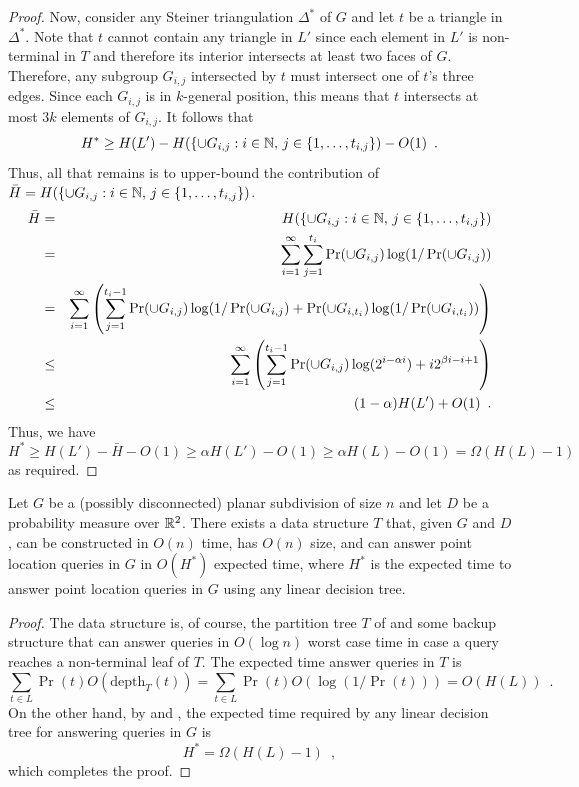\documentclass{patmorin}
\newcommand{\depth}{\mathrm{depth}}
\begin{document}
\begin{proof}
  Now, consider any Steiner triangulation $\Delta^*$ of $G$ and let
  $t$ be a triangle in $\Delta^*$.  Note that $t$ cannot contain any
  triangle in $L'$ since each element in $L'$ is non-terminal in $T$
  and therefore its interior intersects at least two faces of $G$.
  Therefore, any subgroup $G_{i,j}$ intersected by $t$ must intersect one
  of $t$'s three edges. Since each $G_{i,j}$ is in $k$-general position,
  this means that $t$ intersects at most $3k$ elements of $G_{i,j}$.
  It follows \cite[Lemma~3]{cdilm09} that
  \[
    H^* \ge H(L') 
       - H(\{\cup G_{i,j}:i\in\mathbb{N},\, j \in\{1,\ldots,t_{i,j}\}) 
       - O(1) \enspace .
  \]
  Thus, all that remains is to upper-bound the contribution of $\bar{H}=H(\{\cup G_{i,j}:i\in\mathbb{N},\, j \in\{1,\ldots,t_{i,j}\})$.
  \begin{eqnarray*}
    \bar{H} &= & H(\{\cup G_{i,j}:i\in\mathbb{N},\, j \in\{1,\ldots,t_{i,j}\}) \\
     & = & \sum_{i=1}^\infty \sum_{j=1}^{t_{i}} 
         \Pr(\cup G_{i,j})\log(1/\Pr(\cup G_{i,j})) \\
   & = & \sum_{i=1}^\infty
        \left( 
          \sum_{j=1}^{t_{i}-1} 
             \Pr(\cup G_{i,j})\log(1/\Pr(\cup G_{i,j}) 
             + \Pr(\cup G_{i,t_i})\log(1/\Pr(\cup G_{i,t_i}))
        \right) \\
   & \le & \sum_{i=1}^\infty
        \left( 
          \sum_{j=1}^{t_{i}-1} 
             \Pr(\cup G_{i,j})\log(2^{i-\alpha i})
             + i 2^{\beta i - i + 1}
        \right) \\
    & \le & (1-\alpha)H(L') + O(1) \enspace .
  \end{eqnarray*}
  Thus, we have 
  \[  
     H^* \ge H(L') - \bar{H} -O(1) \ge \alpha H(L') - O(1) 
         \ge \alpha H(L) - O(1) = \Omega(H(L) - 1) 
  \]
  as required.
\end{proof}

\begin{thm}
  Let $G$ be a (possibly disconnected) planar subdivision of size $n$
  and let $D$ be a probability measure over $\mathbb{R}^2$.  There exists a data
  structure $T$ that, given $G$ and $D$, can be constructed in $O(n)$
  time, has $O(n)$ size, and can answer point location queries in $G$
  in $O(H^*)$ expected time, where $H^*$ is the expected time to answer
  point location queries in $G$ using any linear decision tree.
\end{thm}

\begin{proof}
  The data structure is, of course, the partition tree $T$ of
   and some backup structure that can answer
  queries in $O(\log n)$ worst case time in case a query reaches a
  non-terminal leaf of $T$.  The expected time answer queries in $T$ is
  \[
     \sum_{t\in L} \Pr(t)O(\depth_T(t)) = \sum_{t\in L}\Pr(t)O(\log(1/\Pr(t))) = O(H(L)) \enspace .
  \]
  On the other hand, by  and ,
  the expected time required by any linear decision tree for answering
  queries in $G$ is
  \[
      H^* = \Omega(H(L) - 1) \enspace ,
  \]
  which completes the proof.
\end{proof}
\end{document}
